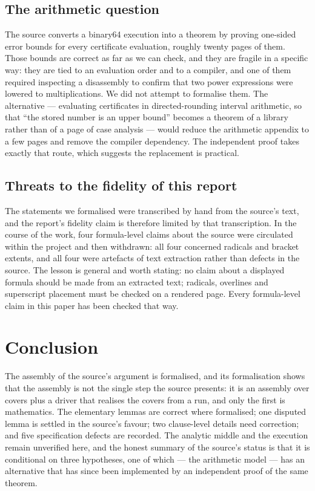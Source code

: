 \documentclass[11pt]{article}
\theoremstyle{definition}
\begin{document}
\subsection{The arithmetic question}

The source converts a binary64 execution into a theorem by proving one-sided error bounds for every
certificate evaluation, roughly twenty pages of them. Those bounds are correct as far as we can
check, and they are fragile in a specific way: they are tied to an evaluation order and to a
compiler, and one of them required inspecting a disassembly to confirm that two power expressions
were lowered to multiplications. We did not attempt to formalise them. The alternative --- evaluating
certificates in directed-rounding interval arithmetic, so that ``the stored number is an upper
bound'' becomes a theorem of a library rather than of a page of case analysis --- would reduce the
arithmetic appendix to a few pages and remove the compiler dependency. The independent proof
\cite{WT26} takes exactly that route, which suggests the replacement is practical.

\subsection{Threats to the fidelity of this report}

The statements we formalised were transcribed by hand from the source's text, and the report's
fidelity claim is therefore limited by that transcription. In the course of the work, four
formula-level claims about the source were circulated within the project and then withdrawn: all
four concerned radicals and bracket extents, and all four were artefacts of text extraction rather
than defects in the source. The lesson is general and worth stating: no claim about a displayed
formula should be made from an extracted text; radicals, overlines and superscript placement must be
checked on a rendered page. Every formula-level claim in this paper has been checked that way.

\section{Conclusion}

The assembly of the source's argument is formalised, and its formalisation shows that the assembly
is not the single step the source presents: it is an assembly over covers plus a driver that
realises the covers from a run, and only the first is mathematics. The elementary lemmas are
correct where formalised; one disputed lemma is settled in the source's favour; two clause-level
details need correction; and five specification defects are recorded. The analytic middle and the
execution remain unverified here, and the honest summary of the source's status is that it is
conditional on three hypotheses, one of which --- the arithmetic model --- has an alternative that
has since been implemented by an independent proof of the same theorem.
\end{document}
